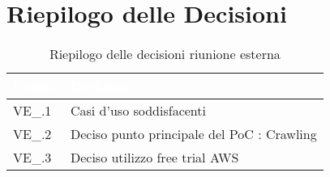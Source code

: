 \section{Riepilogo delle Decisioni}


\begin{table}[!htbp]
\renewcommand{\arraystretch}{1.5}
\begin{tabular}{m{}<{\centering}  m{}<{\centering}}
\rowcolor{darkblue} \textcolor{white}{\textbf{Codice}} & \textcolor{white}{\textbf{Decisione}} \\
\hline
VE\_\D{}.1 & Casi d'uso soddisfacenti \\
\rowcolor{gray!10} VE\_\D{}.2 & Deciso punto principale del PoC : Crawling \\
VE\_\D{}.3 & Deciso utilizzo free trial AWS\\
\end{tabular}
\caption{Riepilogo delle decisioni riunione esterna \D{}}
\end{table}